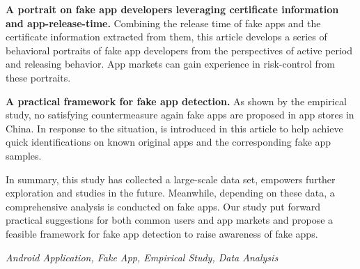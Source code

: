 \textbf{A portrait on fake app developers leveraging certificate information and app-release-time. }
Combining the release time of fake apps and the certificate information extracted from them, this article develops a series of behavioral portraits of fake app developers from the perspectives of active period and releasing behavior.
App markets can gain experience in risk-control from these portraits.

\textbf{A practical framework for fake app detection. }
As shown by the empirical study, no satisfying countermeasure again fake apps are proposed in app stores in China.
In response to the situation, \mytool is introduced in this article to help achieve quick identifications on known original apps and the corresponding fake app samples.

In summary, this study has collected a large-scale data set, empowers further exploration and studies in the future.
Meanwhile, depending on these data, a comprehensive analysis is conducted on fake apps.
Our study put forward practical suggestions for both common users and app markets and propose a feasible framework for fake app detection to raise awareness of fake apps.

{} \textit{Android Application, Fake App, Empirical Study, Data Analysis}
